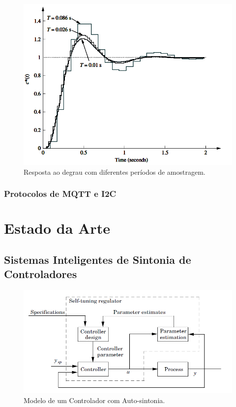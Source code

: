 \begin{figure}[!ht]
  \caption{Resposta ao degrau com diferentes períodos de amostragem.}
  \begin{center}
      \includegraphics[scale=0.65]{img/nise_digitalinput_p761}
  \end{center}
  \label{fig:nise_digitalinput_p761}
\end{figure}

\subsubsection{Protocolos de MQTT e I2C}
\section{Estado da Arte}

\subsection{Sistemas Inteligentes de Sintonia de Controladores}


\begin{figure}[!ht]
  \caption{Modelo de um Controlador com Auto-sintonia.}
  \begin{center}
      \includegraphics[scale=0.75]{img/pid_adaptative_astrom_p233}
  \end{center}
  \label{fig:pid_adaptative_astrom_p233}
\end{figure}


